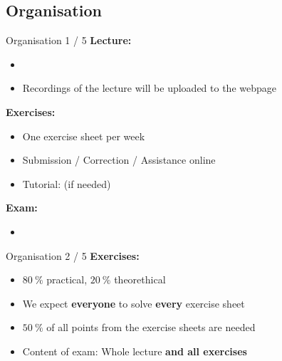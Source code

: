 \subsection{Organisation}

\begin{frame}{Organisation 1 / 5}
  \textbf{Lecture:}
  \begin{itemize}
    \item
      {\color{MainB}\LectureOrganisationLecture}
    \item
      Recordings of the lecture will be uploaded to the webpage
  \end{itemize}
  \textbf{Exercises:}
  \begin{itemize}
    \item
      One exercise sheet per week
    \item
      Submission / Correction / Assistance online
    \item
      Tutorial: (if needed)\\
      {\color{MainB}\LectureOrganisationHelp}
  \end{itemize}
  \textbf{Exam:}\\
  \begin{itemize}
    \item
      {\color{MainB}\LectureOrganisationExam}
  \end{itemize}
\end{frame}


\begin{frame}{Organisation 2 / 5}
  \textbf{Exercises:}
  \begin{itemize}
    \item
      {\color{MainA}$\SI{80}{\percent}$} practical,
      {\color{MainA}$\SI{20}{\percent}$} theorethical
    \item<2- |handout:1>
      We expect \textbf{everyone} to solve \textbf{every} exercise sheet
  \end{itemize}
  \begin{itemize}
    \item<4- |handout:1>
      {\color{MainA}$\SI{50}{\percent}$} of all points from
      the exercise sheets are needed
    \item<5- |handout:1>
      Content of exam: Whole lecture \textbf{and all exercises}
  \end{itemize}
\end{frame}

